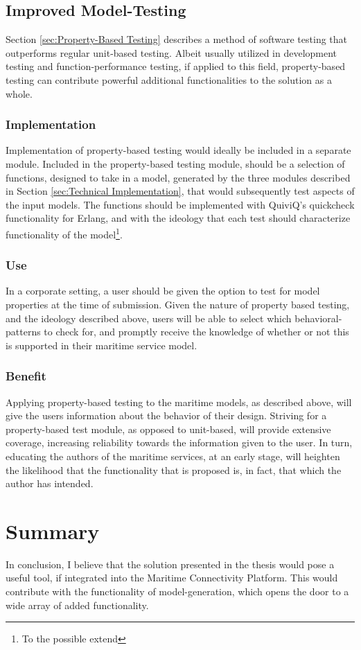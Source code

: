 \subsection{Improved Model-Testing}
Section \ref{sec:Property-Based Testing} describes a method of software testing that outperforms regular unit-based testing. Albeit usually utilized in development testing and function-performance testing, if applied to this field, property-based testing can contribute powerful additional functionalities to the solution as a whole. 
\subsubsection{Implementation}
Implementation of property-based testing would ideally be included in a separate module. Included in the property-based testing module, should be a selection of functions, designed to take in a model, generated by the three modules described in Section \ref{sec:Technical Implementation}, that would subsequently test aspects of the input models. The functions should be implemented with QuiviQ's quickcheck functionality for Erlang, and with the ideology that each test should characterize  functionality of the model\footnote{To the possible extend}.
\subsubsection{Use}
In a corporate setting, a user should be given the option to test for model properties at the time of submission. Given the nature of property based testing, and the ideology described above, users will be able to select which behavioral-patterns to check for, and promptly receive the knowledge of whether or not this is supported in their maritime service model.
\subsubsection{Benefit}
Applying property-based testing to the maritime models, as described above, will give the users information about the behavior of their design. Striving for a property-based test module, as opposed to unit-based, will provide extensive coverage, increasing reliability towards the information given to the user. In turn, educating the authors of the maritime services, at an early stage, will heighten the likelihood that the functionality that is proposed is, in fact, that which the author has intended.
\section{Summary}
In conclusion, I believe that the solution presented in the thesis would pose a useful tool, if integrated into the Maritime Connectivity Platform. This would contribute with the functionality of model-generation, which opens the door to a wide array of added functionality. 

